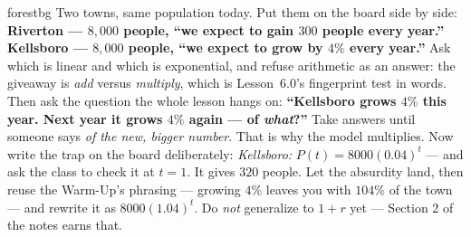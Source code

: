 \documentclass[10pt]{article}
\begin{document}
\begin{skillbox}[Hook]{forestbg}
    Two towns, same population today. Put them on the board side by side: \textbf{Riverton --- $8{,}000$
    people, ``we expect to gain $300$ people every year.''} \textbf{Kellsboro --- $8{,}000$ people,
    ``we expect to grow by $4\%$ every year.''} Ask which is linear and which is exponential, and
    refuse arithmetic as an answer: the giveaway is \emph{add} versus \emph{multiply}, which is
    Lesson~6.0's fingerprint test in words. Then ask the question the whole lesson hangs on:
    \textbf{``Kellsboro grows $4\%$ this year. Next year it grows $4\%$ again --- of \emph{what}?''}
    Take answers until someone says \emph{of the new, bigger number}. That is why the model
    multiplies. Now write the trap on the board deliberately: \emph{Kellsboro:} $P(t)=8000(0.04)^{t}$
    --- and ask the class to check it at $t=1$. It gives $320$ people. Let the absurdity land, then
    reuse the Warm-Up's phrasing --- growing $4\%$ leaves you with $104\%$ of the town --- and
    rewrite it as $8000(1.04)^{t}$. Do \emph{not}
    generalize to $1+r$ yet --- Section 2 of the notes earns that.
\end{skillbox}
\end{document}
